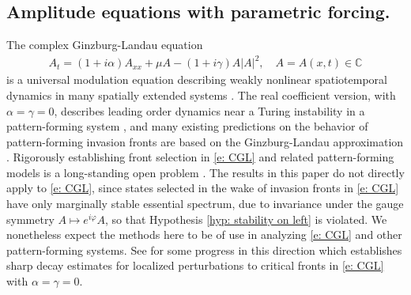 \documentclass[11pt]{article}
\newcommand{\C}{\mathbb{C}}
\renewcommand{\phi}{\varphi}
\numberwithin{equation}{section}
\numberwithin{prop}{section}
\begin{document}
\subsection{Amplitude equations with parametric forcing.} The complex Ginzburg-Landau equation
\begin{align}
A_t = (1+i \alpha) A_{xx} + \mu A -(1+i \gamma) A|A|^2, \quad A = A(x,t) \in \C \label{e: CGL}
\end{align}
is a universal modulation equation describing weakly nonlinear spatiotemporal dynamics in many spatially extended systems \cite{AransonKramer}. The real coefficient version, with $\alpha = \gamma = 0$, describes leading order dynamics near a Turing instability in a pattern-forming system \cite{CrossHohenberg}, and many existing predictions on the behavior of pattern-forming invasion fronts are based on the Ginzburg-Landau approximation \cite{vanSaarloosReview}. Rigorously establishing front selection in \eqref{e: CGL} and related pattern-forming models is a long-standing open problem \cite{vanSaarloosReview, deelanger, colleteckmann, ColletEckmannSH}. The results in this paper do not directly apply to \eqref{e: CGL}, since states selected in the wake of invasion fronts in \eqref{e: CGL} have only marginally stable essential spectrum, due to invariance under the gauge symmetry $A \mapsto e^{i \phi} A$, so that Hypothesis \ref{hyp: stability on left} is violated. We nonetheless expect the methods here to be of use in analyzing \eqref{e: CGL} and other pattern-forming systems. See \cite{AveryScheelGL} for some progress in this direction which establishes sharp decay estimates for localized perturbations to critical fronts in \eqref{e: CGL} with $\alpha = \gamma = 0$. 
\end{document}
